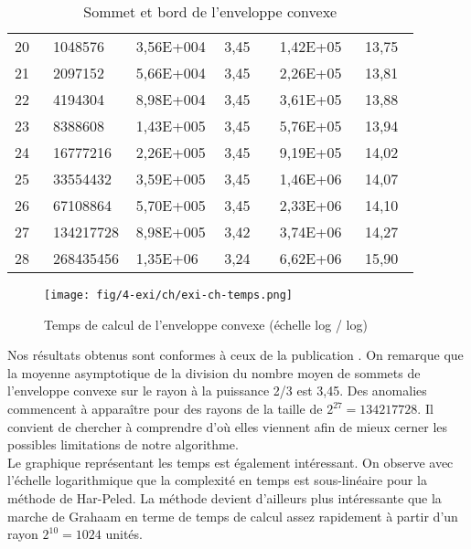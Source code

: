 \begin{table}[H]
\begin{tabular}{|p{0.09\linewidth}|p{0.13\linewidth}||p{0.2\linewidth}|p{0.13\linewidth}||p{0.2\linewidth}|p{0.13\linewidth}|}
    20 & 1048576   & 3,56E+004 & 3,45 & 1,42E+05 &  13,75\\
    21 & 2097152   & 5,66E+004 & 3,45 & 2,26E+05 &  13,81\\
    22 & 4194304   & 8,98E+004 & 3,45 & 3,61E+05 &  13,88\\
    23 & 8388608   & 1,43E+005 & 3,45 & 5,76E+05 &  13,94\\
    24 & 16777216  & 2,26E+005 & 3,45 & 9,19E+05 &  14,02\\
    25 & 33554432  & 3,59E+005 & 3,45 & 1,46E+06 &  14,07\\
    26 & 67108864  & 5,70E+005 & 3,45 & 2,33E+06 &  14,10\\
    27 & 134217728 & 8,98E+005 & 3,42 & 3,74E+06 &  14,27\\
    28 & 268435456 & 1,35E+06  & 3,24 & 6,62E+06 &  15,90\\
    \hline
  \end{tabular} 
  \caption{Sommet et bord de l'enveloppe convexe}
  \label{tab:ch} 
\end{table}

\begin{figure}[H]
  \centering
  \texttt{[image: fig/4-exi/ch/exi-ch-temps.png]}
  \caption{Temps de calcul de l'enveloppe convexe (échelle log / log)}
\label{tab:ch-time}   
\end{figure}


Nos résultats obtenus sont conformes à ceux de la publication \cite{HarPeled98}. On remarque que la moyenne asymptotique de la division du nombre moyen de sommets de l'enveloppe convexe sur le rayon à la puissance 2/3 est 3,45. Des anomalies commencent à apparaître pour des rayons de la taille de $2^{27} = 134217728$. Il convient de chercher à comprendre d'où elles viennent afin de mieux cerner les possibles limitations de notre algorithme.\\

Le graphique représentant les temps est également intéressant. On observe avec l'échelle logarithmique que la complexité en temps est sous-linéaire pour la méthode de Har-Peled. La méthode devient d'ailleurs plus intéressante que la marche de Grahaam en terme de temps de calcul assez rapidement à partir d'un rayon $2^{10} = 1024$ unités. 



